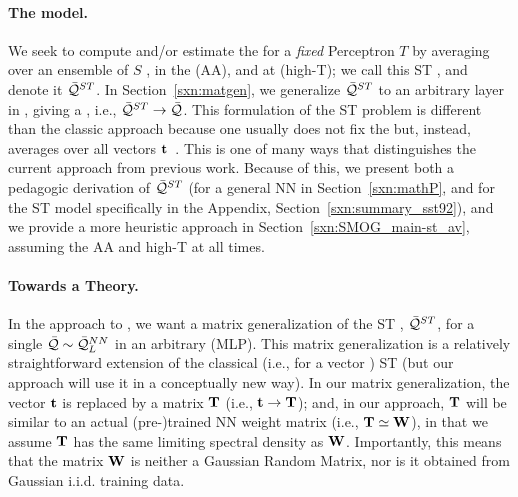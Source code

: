 \paragraph{The \StudentTeacher model.}
We seek to compute and/or estimate the \AverageGeneralizationAccuracy for a \emph{fixed} \Teacher Perceptron $T$
by averaging over an ensemble of \Student $S$ \Perceptrons, in the \AnnealedApproximation (AA), and at
\HighTemperature (high-T); we call this ST \ModelQuality, and denote it $\bar{\mathcal{Q}}^{ST}$.
In Section~\ref{sxn:matgen}, we generalize $\bar{\mathcal{Q}}^{ST}$ to an
arbitrary layer in \MultiLayerPerceptron, giving a \LayerQuality, i.e., $\bar{\mathcal{Q}}^{ST}\rightarrow\bar{\mathcal{Q}}$.
This formulation of the ST problem is different than the classic approach because one
usually does not fix the \Teacher but, instead,
averages over all \Teacher vectors ${\mathbf{t}}$~\cite{SST92,engel2001statistical}.
This is one of many ways that distinguishes the current approach from previous work.
Because of this, we present both a pedagogic derivation of $\bar{\mathcal{Q}}^{ST}$
(for a general NN in Section~\ref{sxn:mathP}, and for the ST model specifically
in the Appendix, Section~\ref{sxn:summary_sst92}),
and we provide a more heuristic approach in Section~\ref{sxn:SMOG_main-st_av}, assuming
the AA and high-T at all times.


\paragraph{Towards a \SemiEmpirical Theory.}
In the \SETOL approach to \STATMECH, we want a matrix generalization of the ST \ModelQuality, $\bar{\mathcal{Q}}^{ST}$, for a single \LayerQuality
$\bar{\mathcal{Q}}\sim\bar{\mathcal{Q}}^{NN}_{L}$ in an arbitrary \MultiLayerPerceptron (MLP).
This matrix generalization is a relatively straightforward extension of the classical (i.e., for a vector \Teacher) \SMOG ST \ModelQuality (but our \SETOL approach will use it in a conceptually new way).
%
In our matrix generalization, the \Teacher vector ${\mathbf{t}}$ is replaced by a \Teacher matrix ${\mathbf{T}}$ (i.e., ${\mathbf{t}}\rightarrow{\mathbf{T}}$); 
and, in our \SETOL approach, ${\mathbf{T}}$ will be similar to an actual (pre-)trained NN weight matrix (i.e., ${\mathbf{T}}\simeq{\mathbf{W}}$), in that we assume ${\mathbf{T}}$ has the same limiting spectral density as ${\mathbf{W}}$. 
Importantly, this means that the matrix ${\mathbf{W}}$ is neither a Gaussian Random Matrix, 
nor is it obtained from Gaussian i.i.d. training data.  

